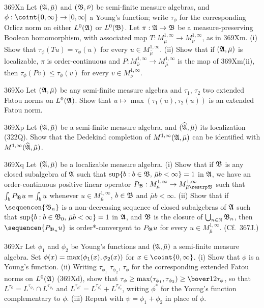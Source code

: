 {\spheader 369Xn Let $(\frak A,\bar\mu)$ and $(\frak B,\bar\nu)$ be
semi-finite measure algebras, and $\phi:\coint{0,\infty}\to[0,\infty]$ a
Young's function;  write $\tau_{\phi}$ for the
corresponding
Orlicz norm on either $L^0(\frak A)$ or $L^0(\frak B)$.
Let $\pi:\frak A\to\frak B$ be a
measure-preserving Boolean homomorphism, with associated map
$T:M^{1,\infty}_{\bar\mu}\to M^{1,\infty}_{\bar\nu}$, as
in 369Xm.   (i) Show that $\tau_{\phi}(Tu)=\tau_{\phi}(u)$ for every
$u\in M^{1,\infty}_{\bar\mu}$.
(ii) Show that if $(\frak A,\bar\mu)$ is localizable, $\pi$ is
order-continuous and 
$P:M^{1,\infty}_{\bar\nu}\to M^{1,\infty}_{\bar\mu}$ is the map of 369Xm(ii), then $\tau_{\phi}(Pv)\le\tau_{\phi}(v)$ for every 
$v\in M^{1,\infty}_{\bar\nu}$.
     
\sqheader 369Xo Let $(\frak A,\bar\mu)$ be any semi-finite measure
algebra and $\tau_1$, $\tau_2$ two extended Fatou norms on 
$L^0(\frak A)$.   Show that $u\mapsto\max(\tau_1(u),\tau_2(u))$ is an extended Fatou norm.
     
\spheader 369Xp Let $(\frak A,\bar\mu)$ be a semi-finite measure
algebra, and $(\widehat{\frak A},\tilde\mu)$ its localization (322Q).
Show that the Dedekind completion of $M^{1,\infty}(\frak A,\bar\mu)$ can
be identified with $M^{1,\infty}(\widehat{\frak A},\tilde\mu)$.
     
\spheader 369Xq Let $(\frak A,\bar\mu)$ be a localizable measure
algebra.   (i) Show that if $\frak B$ is any closed subalgebra of 
$\frak A$ such that $\sup\{b:b\in\frak B,\,\bar\mu b<\infty\}=1$ in 
$\frak A$, we have an order-continuous positive linear operator 
$P_{\frak B}:
M^{1,\infty}_{\bar\mu}\to M^{1,\infty}_{\bar\mu\restrp\frak B}$ 
such that $\int_bP_{\frak B}u=\int_bu$ whenever 
$u\in M^{1,\infty}_{\bar\mu}$, $b\in\frak B$ and $\bar\mu b<\infty$.   
(ii) Show that if $\sequencen{\frak B_n}$ is a
non-decreasing sequence of closed subalgebras of $\frak A$ such that
$\sup\{b:b\in\frak B_0,\,\bar\mu b<\infty\}=1$ in $\frak A$, and 
$\frak B$ is the closure of $\bigcup_{n\in\Bbb N}\frak B_n$, then
$\sequencen{P_{\frak B_n}u}$ is order*-convergent to $P_{\frak B}u$
for every $u\in M^{1,\infty}_{\bar\mu}$.   (Cf.\ 367J.)
     
\spheader 369Xr Let $\phi_1$ and $\phi_2$ be Young's functions
and $(\frak A,\bar\mu)$ a semi-finite measure algebra.   Set
$\phi(x)=\max(\phi_1(x),\penalty-100\phi_2(x))$ for $x\in\coint{0,\infty}$.   (i)
Show that $\phi$ is a Young's function.   (ii) Writing $\tau_{\phi_1}$
$\tau_{\phi_2}$, $\tau_{\phi}$ for the corresponding extended Fatou
norms on $L^0(\frak A)$ (369Xd), show that
$\tau_{\phi}\ge\max(\tau_{\phi_1},\tau_{\phi_2})\ge\bover12\tau_{\phi}$,
so that $L^{\tau_{\phi}}=L^{\tau_{\phi_1}}\cap L^{\tau_{\phi_2}}$ and
$L^{\tau_{\phi^*}}=L^{\tau_{\phi_1^*}}+L^{\tau_{\phi_2^*}}$, writing
$\phi^*$ for the Young's function complementary to $\phi$.   (iii)
Repeat with $\psi=\phi_1+\phi_2$ in place of $\phi$.
     
}
